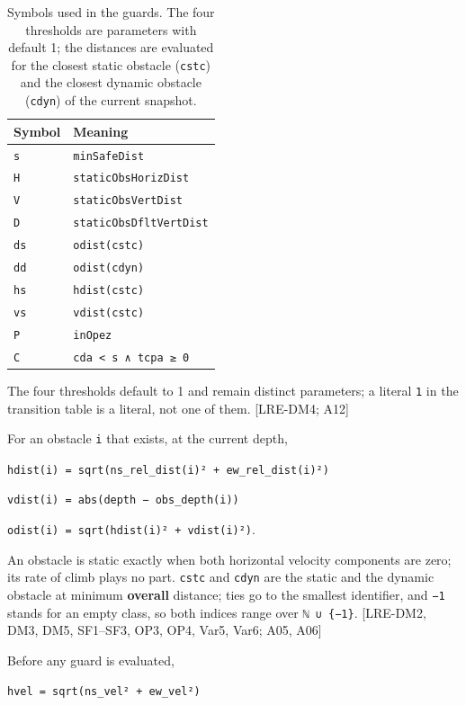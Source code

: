 \documentclass[
  10pt,
]{article}
\begin{document}
\begin{longtable}[]{@{}ll@{}}
\caption{Symbols used in the guards. The four thresholds are parameters with default 1; the distances are evaluated for the closest static obstacle (\texttt{cstc}) and the closest dynamic obstacle (\texttt{cdyn}) of the current snapshot.}\label{tab:symbols}\\
\toprule\noalign{}
Symbol & Meaning \\
\midrule\noalign{}
\endhead
\bottomrule\noalign{}
\endlastfoot
\texttt{s} & \texttt{minSafeDist} \\
\texttt{H} & \texttt{staticObsHorizDist} \\
\texttt{V} & \texttt{staticObsVertDist} \\
\texttt{D} & \texttt{staticObsDfltVertDist} \\
\texttt{ds} & \texttt{odist(cstc)} \\
\texttt{dd} & \texttt{odist(cdyn)} \\
\texttt{hs} & \texttt{hdist(cstc)} \\
\texttt{vs} & \texttt{vdist(cstc)} \\
\texttt{P} & \texttt{inOpez} \\
\texttt{C} & \texttt{cda\ \textless{}\ s\ ∧\ tcpa\ ≥\ 0} \\
\end{longtable}

The four thresholds default to 1 and remain distinct parameters; a
literal \texttt{1} in the transition table is a literal, not one of
them. {[}LRE-DM4; A12{]}

For an obstacle \texttt{i} that exists, at the current depth,

\texttt{hdist(i)\ =\ sqrt(ns\_rel\_dist(i)²\ +\ ew\_rel\_dist(i)²)}

\texttt{vdist(i)\ =\ abs(depth\ −\ obs\_depth(i))}

\texttt{odist(i)\ =\ sqrt(hdist(i)²\ +\ vdist(i)²)}.

An obstacle is static exactly when both horizontal velocity components
are zero; its rate of climb plays no part. \texttt{cstc} and
\texttt{cdyn} are the static and the dynamic obstacle at minimum
\textbf{overall} distance; ties go to the smallest identifier, and
\texttt{−1} stands for an empty class, so both indices range over
\texttt{ℕ\ ∪\ \{−1\}}. {[}LRE-DM2, DM3, DM5, SF1--SF3, OP3, OP4, Var5,
Var6; A05, A06{]}

Before any guard is evaluated,

\texttt{hvel\ =\ sqrt(ns\_vel²\ +\ ew\_vel²)}
\end{document}
